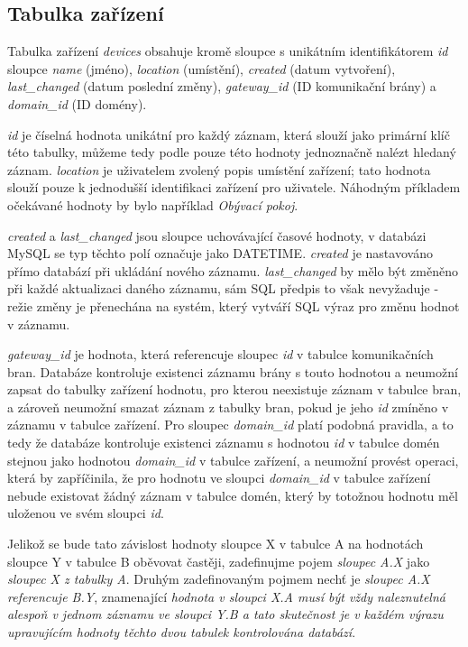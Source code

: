 \subsection{Tabulka zařízení}
Tabulka zařízení \emph{devices} obsahuje kromě sloupce s unikátním identifikátorem \emph{id} sloupce \emph{name} (jméno), \emph{location} (umístění), \emph{created} (datum vytvoření), \emph{last\_changed} (datum poslední změny), \emph{gateway\_id} (ID komunikační brány) a \emph{domain\_id} (ID domény). 

\emph{id} je číselná hodnota unikátní pro každý záznam, která slouží jako primární klíč této tabulky, můžeme tedy podle pouze této hodnoty jednoznačně nalézt hledaný záznam. \emph{location} je uživatelem zvolený popis umístění zařízení; tato hodnota slouží pouze k jednodušší identifikaci zařízení pro uživatele. Náhodným příkladem očekávané hodnoty by bylo například \emph{Obývací pokoj}. 

\emph{created} a \emph{last\_changed} jsou sloupce uchovávající časové hodnoty, v databázi MySQL se typ těchto polí označuje jako DATETIME. \emph{created} je nastavováno přímo databází při ukládání nového záznamu. \emph{last\_changed} by mělo být změněno při každé aktualizaci daného záznamu, sám SQL předpis to však nevyžaduje - režie změny je přenechána na systém, který vytváří SQL výraz pro změnu hodnot v záznamu.

\emph{gateway\_id} je hodnota, která referencuje sloupec \emph{id} v tabulce komunikačních bran. Databáze kontroluje existenci záznamu brány s touto hodnotou a neumožní zapsat do tabulky zařízení hodnotu, pro kterou neexistuje záznam v tabulce bran, a zároveň neumožní smazat záznam z tabulky bran, pokud je jeho \emph{id} zmíněno v záznamu v tabulce zařízení. Pro sloupec \emph{domain\_id} platí podobná pravidla, a to tedy že databáze kontroluje existenci záznamu s hodnotou \emph{id} v tabulce domén stejnou jako hodnotou \emph{domain\_id} v tabulce zařízení, a neumožní provést operaci, která by zapříčinila, že pro hodnotu ve sloupci \emph{domain\_id} v tabulce zařízení nebude existovat žádný záznam v tabulce domén, který by totožnou hodnotu měl uloženou ve svém sloupci \emph{id}.

Jelikož se bude tato závislost hodnoty sloupce X v tabulce A na hodnotách sloupce Y v tabulce B oběvovat častěji, zadefinujme pojem \emph{sloupec A.X} jako \emph{sloupec X z tabulky A}. Druhým zadefinovaným pojmem nechť je \emph{sloupec A.X referencuje B.Y}, znamenající \emph{hodnota v sloupci X.A musí být vždy naleznutelná alespoň v jednom záznamu ve sloupci Y.B a tato skutečnost je v každém výrazu upravujícím hodnoty těchto dvou tabulek kontrolována databází}. 

